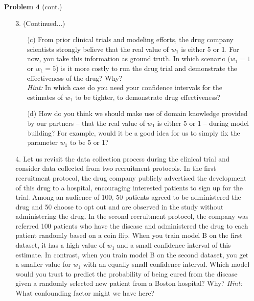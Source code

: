\documentclass[submit]{harvardml}
\begin{document}
\begin{framed}
\noindent\textbf{Problem 4} (cont.)\\
\begin{enumerate}
\item[3.] (Continued...)
     \begin{enumerate}
     \item[(c)] From prior clinical trials and modeling efforts, the drug company scientists strongly believe that the real value of $w_1$ is either 5 or 1. For now, you take this information as ground truth. In which scenario ($w_1=1$ or $w_1=5$) is it more costly to run the drug trial and demonstrate the effectiveness of the drug? Why?\\
        \textit{Hint:} In which case do you need your confidence intervals for the estimates of $w_1$ to be tighter, to demonstrate drug effectiveness?
        \item[(d)] How do you think we should make use of domain knowledge provided by our partners -- that the real value of $w_1$ is either 5 or 1 -- during model building? For example, would it be a good idea for us to simply fix the parameter $w_1$ to be 5 or 1?
    \end{enumerate}
\item[4.] Let us revisit the data collection process during the clinical trial and consider data collected from two recruitment protocols. In the first recruitment protocol, the drug company publicly advertised the development of this drug to a hospital, encouraging interested patients to sign up for the trial. Among an audience of 100, 50 patients agreed to be administered the drug and 50 choose to opt out and are observed in the study without administering the drug. In the second recruitment protocol, the company was referred 100 patients who have the disease and administered the drug to each patient randomly based on a coin flip. When you train model B on the first dataset, it has a high value of $w_1$ and a small confidence interval of this estimate. In contrast, when you train model B on the second dataset, you get a smaller value for $w_1$ with an equally small confidence interval. Which model would you trust to predict the probability of being cured from the disease given a randomly selected new patient from a Boston hospital? Why?
\textit{Hint:} What confounding factor might we have here?

\end{enumerate}
\end{framed}
\end{document}

